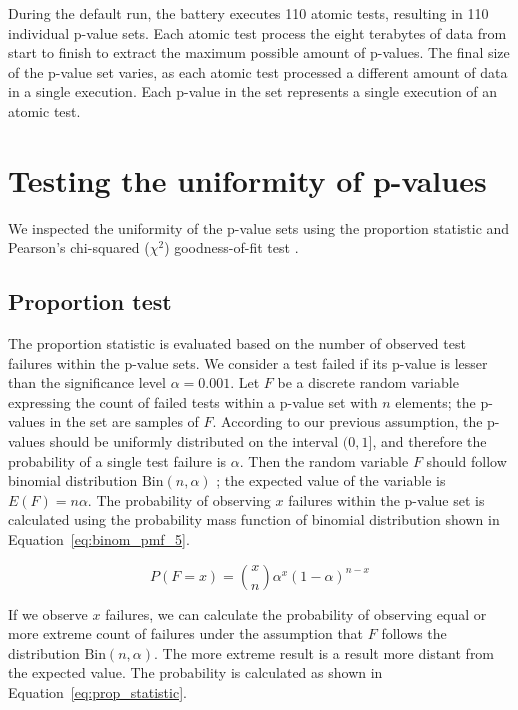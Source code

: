 \documentclass[
	digital,    %
	oneside,    %
	color,
	11pt,
	nocover,
	notable,
	nolof,
	nolot,
]{fithesis3}
\theoremstyle{definition}
\theoremstyle{remark}
\begin{document}
During the default run, the battery executes 110 atomic tests, resulting in 110 individual p-value sets. Each atomic test process the eight terabytes of data from start to finish to extract the maximum possible amount of p-values. The final size of the p-value set varies, as each atomic test processed a different amount of data in a single execution. Each p-value in the set represents a single execution of an atomic test.

\section{Testing the uniformity of p-values}
\label{sec:testing_uniformity_dh}
We inspected the uniformity of the p-value sets using the proportion statistic and Pearson's chi-squared ($\chi^2$) goodness-of-fit test \cite[p.~219]{stat-handbook}.

\subsection{Proportion test}
The proportion statistic is evaluated based on the number of observed test failures within the p-value sets. We consider a test failed if its p-value is lesser than the significance level $\alpha=0.001$. Let $F$ be a discrete random variable expressing the count of failed tests within a p-value set with $n$ elements; the p-values in the set are samples of $F$. According to our previous assumption, the p-values should be uniformly distributed on the interval $(0,1]$, and therefore the probability of a single test failure is $\alpha$. Then the random variable $F$ should follow binomial distribution $\text{Bin}(n,\alpha)$ \cite[p.~245]{stat-handbook}; the expected value of the variable is $E(F) = n\alpha$. The probability of observing $x$ failures within the p-value set is calculated using the probability mass function of binomial distribution shown in Equation~\ref{eq:binom_pmf_5}.

\begin{equation}
\label{eq:binom_pmf_5}
P(F = x) = \binom xn \alpha^x(1-\alpha)^{n-x}
\end{equation}

If we observe $x$ failures, we can calculate the probability of observing equal or more extreme count of failures under the assumption that $F$ follows the distribution $\text{Bin}(n,\alpha)$. The more extreme result is a result more distant from the expected value. The probability is calculated as shown in Equation~\ref{eq:prop_statistic}.
\end{document}
